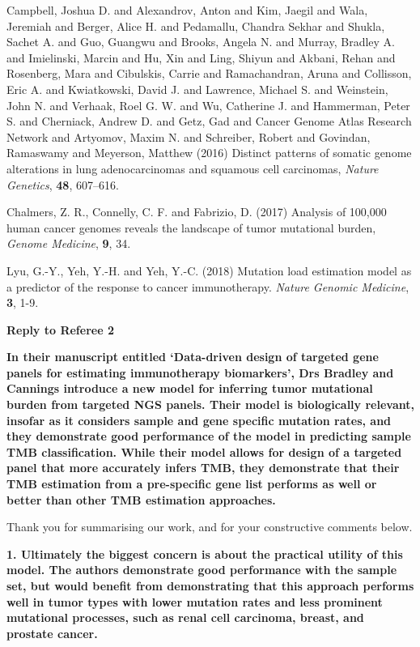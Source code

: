 \documentclass[12pt]{article}
\begin{document}
\begin{thebibliography}{75}
 Campbell, Joshua D. and Alexandrov, Anton and Kim, Jaegil and Wala, Jeremiah and Berger, Alice H. and Pedamallu, Chandra Sekhar and Shukla, Sachet A. and Guo, Guangwu and Brooks, Angela N. and Murray, Bradley A. and Imielinski, Marcin and Hu, Xin and Ling, Shiyun and Akbani, Rehan and Rosenberg, Mara and Cibulskis, Carrie and Ramachandran, Aruna and Collisson, Eric A. and Kwiatkowski, David J. and Lawrence, Michael S. and Weinstein, John N. and Verhaak, Roel G. W. and Wu, Catherine J. and Hammerman, Peter S. and Cherniack, Andrew D. and Getz, Gad and {Cancer Genome Atlas Research Network} and Artyomov, Maxim N. and Schreiber, Robert and Govindan, Ramaswamy and Meyerson, Matthew (2016) Distinct patterns of somatic genome alterations in lung adenocarcinomas and squamous cell carcinomas, \emph{Nature Genetics}, \textbf{48}, 607--616.

 Chalmers, Z. R., Connelly, C. F. and Fabrizio, D. (2017) Analysis of 100,000 human cancer genomes reveals the landscape of tumor mutational burden, \emph{Genome Medicine}, \textbf{9}, 34.

 Lyu, G.-Y., Yeh, Y.-H. and Yeh, Y.-C. (2018) Mutation load estimation model as a predictor of the response to cancer immunotherapy. \emph{Nature Genomic Medicine}, \textbf{3}, 1-9.
\end{thebibliography}

\clearpage

{\large \textbf{Reply to Referee 2}}

\textbf{In their manuscript entitled ‘Data-driven design of targeted gene panels for estimating immunotherapy biomarkers’, Drs Bradley and Cannings introduce a new model for inferring tumor mutational burden from targeted NGS panels. Their model is biologically relevant, insofar as it considers sample and gene specific mutation rates, and they demonstrate good performance of the model in predicting sample TMB classification. While their model allows for design of a targeted panel that more accurately infers TMB, they demonstrate that their TMB estimation from a pre-specific gene list performs as well or better than other TMB estimation approaches.}

Thank you for summarising our work, and for your constructive comments below. 

\textbf{1. Ultimately the biggest concern is about the practical utility of this model. The authors demonstrate good performance with the sample set, but would benefit from demonstrating that this approach performs well in tumor types with lower mutation rates and less prominent mutational processes, such as renal cell carcinoma, breast, and prostate cancer.}
\end{document}
